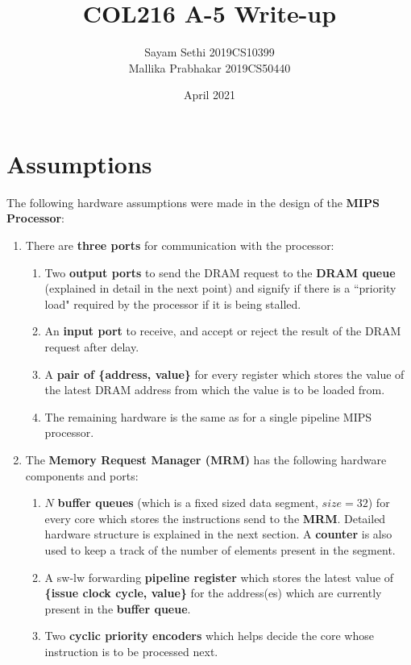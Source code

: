 \documentclass{article}
\title{COL216 A-5 Write-up}
\author{Sayam Sethi 2019CS10399 \\ Mallika Prabhakar 2019CS50440}
\date{April 2021}
\begin{document}

\maketitle
\section{Assumptions}
The following hardware assumptions were made in the design of the \textbf{MIPS Processor}:
\begin{enumerate}
    \item There are \textbf{three ports} for communication with the processor:
        \begin{enumerate}
            \item Two \textbf{output ports} to send the DRAM request to the \textbf{DRAM queue} (explained in detail in the next point) and signify if there is a ``priority load" required by the processor if it is being stalled.
            \item An \textbf{input port} to receive, and accept or reject the result of the DRAM request after delay.
            \item A \textbf{pair of \{address, value\}} for every register which stores the value of the latest DRAM address from which the value is to be loaded from.
            \item The remaining hardware is the same as for a single pipeline MIPS processor.
        \end{enumerate}
    \item The \textbf{Memory Request Manager (MRM)} has the following hardware components and ports:
        \begin{enumerate}
            \item $N$ \textbf{buffer queues} (which is a fixed sized data segment, $size = 32$) for every core which stores the instructions send to the \textbf{MRM}. Detailed hardware structure is explained in the next section. A \textbf{counter} is also used to keep a track of the number of elements present in the segment.
            \item A sw-lw forwarding \textbf{pipeline register} which stores the latest value of \textbf{\{issue clock cycle, value\}} for the address(es) which are currently present in the \textbf{buffer queue}.
            \item Two \textbf{cyclic priority encoders} which helps decide the core whose instruction is to be processed next.

\end{enumerate}
\end{enumerate}
\end{document}
